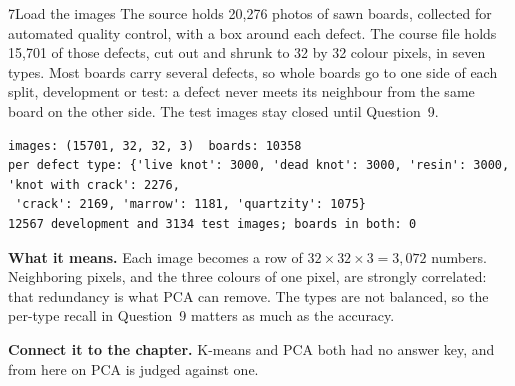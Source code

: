 
\begin{labquestion}{7}{Load the images}
The source holds 20,276 photos of sawn boards, collected for automated quality control, with a box around each defect. The course file holds 15,701 of those defects, cut out and shrunk to 32 by 32 colour pixels, in seven types. Most boards carry several defects, so whole boards go to one side of each split, development or test: a defect never meets its neighbour from the same board on the other side. The test images stay closed until Question~9.
\end{labquestion}
\begin{labanswer}

\begin{refoutput}
\begin{lstlisting}[style=utpterminal]
images: (15701, 32, 32, 3)  boards: 10358
per defect type: {'live knot': 3000, 'dead knot': 3000, 'resin': 3000, 'knot with crack': 2276,
 'crack': 2169, 'marrow': 1181, 'quartzity': 1075}
12567 development and 3134 test images; boards in both: 0
\end{lstlisting}
\end{refoutput}

\textbf{What it means.} Each image becomes a row of $32\times32\times3=3{,}072$ numbers. Neighboring pixels, and the three colours of one pixel, are strongly correlated: that redundancy is what PCA can remove. The types are not balanced, so the per-type recall in Question~9 matters as much as the accuracy.
\end{labanswer}

\textbf{Connect it to the chapter.} K-means and PCA both had no answer key, and from here on PCA is judged against one.


